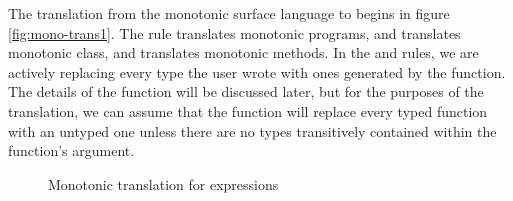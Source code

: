 \documentclass[a4paper,USenglish]{tex/lipics-v2016}
\begin{document}
The translation from the monotonic surface language to \kafka begins 
in figure \ref{fig:mono-trans1}. The rule  translates 
monotonic programs,  and  translates monotonic class,
and  translates monotonic methods. In the  
and  rules, we are actively replacing every type the user wrote with ones generated by the 
 function. The details of the  function will be 
discussed later, but for the purposes of the translation, we can assume that the
 function will replace every typed function with an untyped one unless
there are no \any types transitively contained within the function's argument.

\begin{figure}[!ht]
\begin{mathpar}




\end{mathpar}
\caption{Monotonic translation for expressions}
\label{fig:mono-trans2}
\end{figure}
\end{document}
